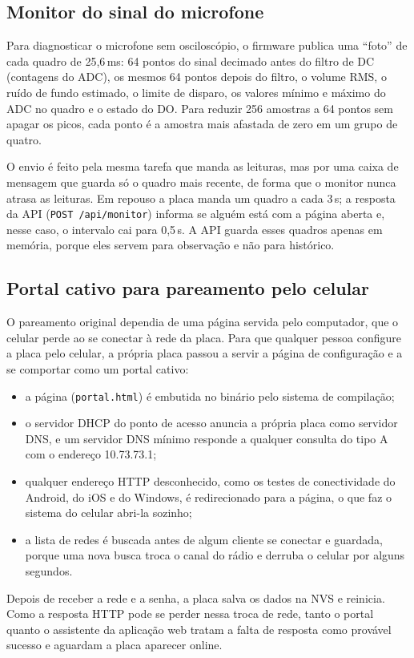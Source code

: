 \subsection{Monitor do sinal do microfone}
\label{sec:monitor}

Para diagnosticar o microfone sem osciloscópio, o firmware publica uma ``foto'' de cada quadro de 25,6\,ms: 64 pontos do sinal decimado antes do filtro de DC (contagens do ADC), os mesmos 64 pontos depois do filtro, o volume RMS, o ruído de fundo estimado, o limite de disparo, os valores mínimo e máximo do ADC no quadro e o estado do DO. Para reduzir 256 amostras a 64 pontos sem apagar os picos, cada ponto é a amostra mais afastada de zero em um grupo de quatro.

O envio é feito pela mesma tarefa que manda as leituras, mas por uma caixa de mensagem que guarda só o quadro mais recente, de forma que o monitor nunca atrasa as leituras. Em repouso a placa manda um quadro a cada 3\,s; a resposta da API (\texttt{POST /api/monitor}) informa se alguém está com a página aberta e, nesse caso, o intervalo cai para 0,5\,s. A API guarda esses quadros apenas em memória, porque eles servem para observação e não para histórico.

\subsection{Portal cativo para pareamento pelo celular}

O pareamento original dependia de uma página servida pelo computador, que o celular perde ao se conectar à rede da placa. Para que qualquer pessoa configure a placa pelo celular, a própria placa passou a servir a página de configuração e a se comportar como um portal cativo:
\begin{itemize}
  \item a página (\texttt{portal.html}) é embutida no binário pelo sistema de compilação;
  \item o servidor DHCP do ponto de acesso anuncia a própria placa como servidor DNS, e um servidor DNS mínimo responde a qualquer consulta do tipo A com o endereço 10.73.73.1;
  \item qualquer endereço HTTP desconhecido, como os testes de conectividade do Android, do iOS e do Windows, é redirecionado para a página, o que faz o sistema do celular abri-la sozinho;
  \item a lista de redes é buscada antes de algum cliente se conectar e guardada, porque uma nova busca troca o canal do rádio e derruba o celular por alguns segundos.
\end{itemize}
Depois de receber a rede e a senha, a placa salva os dados na NVS e reinicia. Como a resposta HTTP pode se perder nessa troca de rede, tanto o portal quanto o assistente da aplicação web tratam a falta de resposta como provável sucesso e aguardam a placa aparecer online. 

